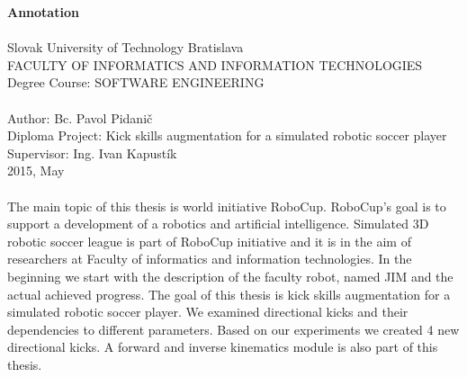 \begin{titlepage}
\large \textbf{Annotation} \\ \\
\normalsize
Slovak University of Technology Bratislava \\
FACULTY OF INFORMATICS AND INFORMATION TECHNOLOGIES \\
Degree Course: SOFTWARE ENGINEERING  \\
 \\
Author: Bc. Pavol Pidanič \\
Diploma Project: Kick skills augmentation for a simulated robotic soccer player \\ 
Supervisor: Ing. Ivan Kapustík  \\
2015, May \\
\\
The main topic of this thesis is world initiative RoboCup. RoboCup's goal is to support a development of a robotics and artificial intelligence. Simulated 3D robotic soccer league is part of RoboCup initiative and it is in the aim of researchers at Faculty of informatics and information technologies. In the beginning we start with the description of the faculty robot, named JIM and the actual achieved progress. The goal of this thesis is kick skills augmentation for a simulated robotic soccer player. We examined directional kicks and their dependencies to different parameters. Based on our experiments we created 4 new directional kicks. A forward and inverse kinematics module is also part of this thesis.



\end{titlepage}
